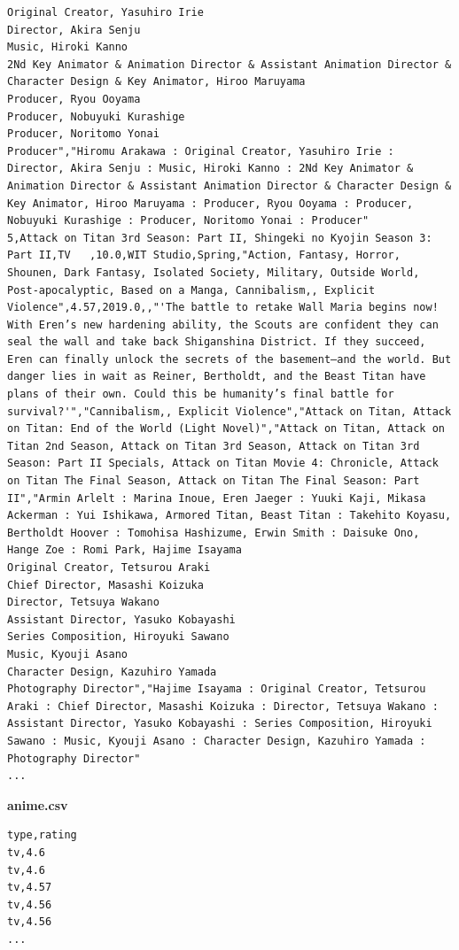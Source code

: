 \begin{verbatim}
Original Creator, Yasuhiro Irie
Director, Akira Senju
Music, Hiroki Kanno
2Nd Key Animator & Animation Director & Assistant Animation Director & Character Design & Key Animator, Hiroo Maruyama
Producer, Ryou Ooyama
Producer, Nobuyuki Kurashige
Producer, Noritomo Yonai
Producer","Hiromu Arakawa : Original Creator, Yasuhiro Irie : Director, Akira Senju : Music, Hiroki Kanno : 2Nd Key Animator & Animation Director & Assistant Animation Director & Character Design & Key Animator, Hiroo Maruyama : Producer, Ryou Ooyama : Producer, Nobuyuki Kurashige : Producer, Noritomo Yonai : Producer"
5,Attack on Titan 3rd Season: Part II, Shingeki no Kyojin Season 3: Part II,TV   ,10.0,WIT Studio,Spring,"Action, Fantasy, Horror, Shounen, Dark Fantasy, Isolated Society, Military, Outside World, Post-apocalyptic, Based on a Manga, Cannibalism,, Explicit Violence",4.57,2019.0,,"'The battle to retake Wall Maria begins now! With Eren’s new hardening ability, the Scouts are confident they can seal the wall and take back Shiganshina District. If they succeed, Eren can finally unlock the secrets of the basement—and the world. But danger lies in wait as Reiner, Bertholdt, and the Beast Titan have plans of their own. Could this be humanity’s final battle for survival?'","Cannibalism,, Explicit Violence","Attack on Titan, Attack on Titan: End of the World (Light Novel)","Attack on Titan, Attack on Titan 2nd Season, Attack on Titan 3rd Season, Attack on Titan 3rd Season: Part II Specials, Attack on Titan Movie 4: Chronicle, Attack on Titan The Final Season, Attack on Titan The Final Season: Part II","Armin Arlelt : Marina Inoue, Eren Jaeger : Yuuki Kaji, Mikasa Ackerman : Yui Ishikawa, Armored Titan, Beast Titan : Takehito Koyasu, Bertholdt Hoover : Tomohisa Hashizume, Erwin Smith : Daisuke Ono, Hange Zoe : Romi Park, Hajime Isayama
Original Creator, Tetsurou Araki
Chief Director, Masashi Koizuka
Director, Tetsuya Wakano
Assistant Director, Yasuko Kobayashi
Series Composition, Hiroyuki Sawano
Music, Kyouji Asano
Character Design, Kazuhiro Yamada
Photography Director","Hajime Isayama : Original Creator, Tetsurou Araki : Chief Director, Masashi Koizuka : Director, Tetsuya Wakano : Assistant Director, Yasuko Kobayashi : Series Composition, Hiroyuki Sawano : Music, Kyouji Asano : Character Design, Kazuhiro Yamada : Photography Director"
...
\end{verbatim}

\noindent\textbf{anime.csv}
\begin{verbatim}
type,rating
tv,4.6
tv,4.6
tv,4.57
tv,4.56
tv,4.56
...
\end{verbatim}

